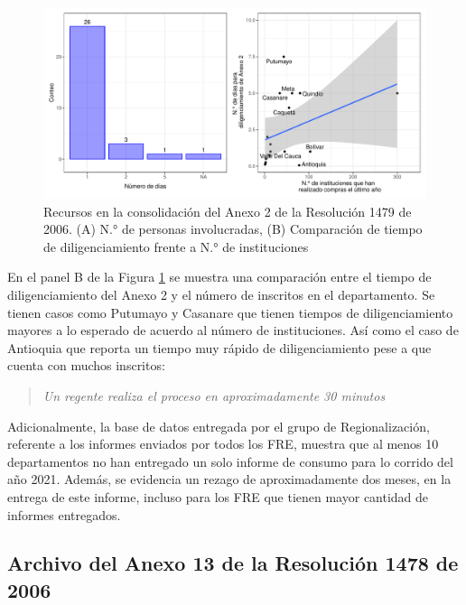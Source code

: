 \documentclass[
]{book}
\begin{document}
\begin{figure}

{\centering \includegraphics[width=1\linewidth]{InformeFinal_files/figure-latex/TiemposConsolidacionA2-1} 

}

\caption{Recursos en la consolidación del Anexo 2 de la Resolución 1479 de 2006. (A) N.° de personas involucradas, (B) Comparación de tiempo de diligenciamiento frente a N.° de instituciones}\label{fig:TiemposConsolidacionA2}
\end{figure}

En el panel B de la Figura \ref{fig:TiemposConsolidacionA2} se muestra una comparación entre el tiempo de diligenciamiento del Anexo 2 y el número de inscritos en el departamento. Se tienen casos como Putumayo y Casanare que tienen tiempos de diligenciamiento mayores a lo esperado de acuerdo al número de instituciones. Así como el caso de Antioquia que reporta un tiempo muy rápido de diligenciamiento pese a que cuenta con muchos inscritos:

\begin{quote}
\emph{Un regente realiza el proceso en aproximadamente 30 minutos}
\end{quote}

Adicionalmente, la base de datos entregada por el grupo de Regionalización, referente a los informes enviados por todos los FRE, muestra que al menos 10 departamentos no han entregado un solo informe de consumo para lo corrido del año 2021. Además, se evidencia un rezago de aproximadamente dos meses, en la entrega de este informe, incluso para los FRE que tienen mayor cantidad de informes entregados.

\hypertarget{archivo-del-anexo-13-de-la-resoluciuxf3n-1478-de-2006}{%
\subsection{Archivo del Anexo 13 de la Resolución 1478 de 2006}\label{archivo-del-anexo-13-de-la-resoluciuxf3n-1478-de-2006}}
\end{document}
